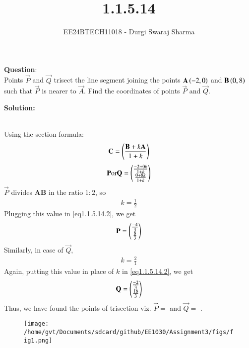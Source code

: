 \documentclass[journal]{IEEEtran}
\begin{document}

\vspace{3cm}

\title{1.1.5.14}
\author{EE24BTECH11018 - Durgi Swaraj Sharma
}
{\let\newpage\relax\maketitle}

\renewcommand{\thefigure}{\theenumi}
\renewcommand{\thetable}{\theenumi}
\setlength{\intextsep}{10pt} %


\renewcommand{\thetable}{\theenumi}


 \textbf{Question}:\\
Points $\vec{P}$ and $\vec{Q}$ trisect the line segment joining the points $\mathbf{A}\left(-2, 0\right)$ and $\mathbf{B}\left(0, 8\right)$ such that $\vec{P}$ is nearer to $\vec{A}$. Find the coordinates of points $\vec{P}$ and $\vec{Q}$. \hfill {}

\textbf{Solution: }\\
    \begin{table}[h!]    
      \centering
      
      \caption{}
    \end{table}\\
 Using the section formula:
\begin{align}
	\mathbf{C} = \left(\frac{\mathbf{B}+k\mathbf{A}}{1+k}\right) \label{eq1.1.5.14.1}
\end{align}
\begin{align}
	\mathbf{P} \text{or} \mathbf{Q} = \begin{pmatrix}\frac{-2+0k}{1+k} \\ \frac{0+8k}{1+k}\end{pmatrix} \label{eq1.1.5.14.2}
\end{align}
$\vec{P}$ divides \textbf{AB} in the ratio $1:2$, so 
\begin{align}
	k = \frac{1}{2}
\end{align}
Plugging this value in \ref{eq1.1.5.14.2}, we get
\begin{align}
	\mathbf{P} = \begin{pmatrix}\frac{-4}{3} \\ \frac{8}{3}\end{pmatrix}
\end{align}
Similarly, in case of $\vec{Q}$,
\begin{align}
	k = \frac{2}{1}
\end{align}
Again, putting this value in place of $k$ in \ref{eq1.1.5.14.2}, we get
\begin{align}
	\mathbf{Q} = \begin{pmatrix}\frac{-2}{3} \\ \frac{16}{3}\end{pmatrix}
\end{align}
Thus, we have found the points of trisection viz. $\vec{P} =$  and $\vec{Q} =$ . 


    \begin{figure}[h]
        \centering
       \texttt{[image: /home/gvt/Documents/sdcard/github/EE1030/Assignment3/figs/fig1.png]}
       \caption{}
       \label{graph}
    \end{figure}
\end{document}
